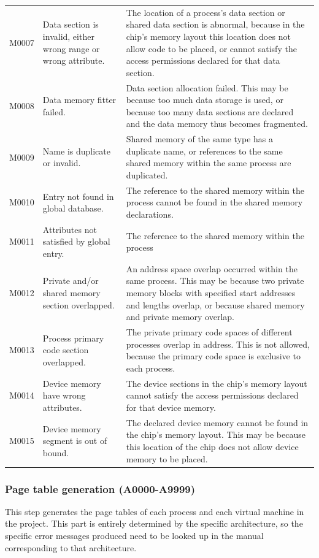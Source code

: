 \begin{xltabular}{\textwidth}{@{}>{\hsize\raggedright\arraybackslash}X>{\hsize\raggedright\arraybackslash}X>{\hsize\raggedright\arraybackslash}X@{}}
M0007 & Data section is invalid, either wrong range or wrong attribute.
&
The location of a process's data section or shared data section is abnormal, because in the chip's memory layout this location does not allow code to be placed, or cannot satisfy the access permissions declared for that data section.\tabularnewline
M0008 & Data memory fitter failed. &
Data section allocation failed. This may be because too much data storage is used, or because too many data sections are declared and the data memory thus becomes fragmented.\tabularnewline
M0009 & Name is duplicate or invalid. &
Shared memory of the same type has a duplicate name, or references to the same shared memory within the same process are duplicated.\tabularnewline
M0010 & Entry not found in global database. &
The reference to the shared memory within the process cannot be found in the shared memory declarations.\tabularnewline
M0011 & Attributes not satisfied by global entry. &
The reference to the shared memory within the process\tabularnewline
M0012 & Private and/or shared memory section overlapped. &
An address space overlap occurred within the same process. This may be because two private memory blocks with specified start addresses and lengths overlap, or because shared memory and private memory overlap.\tabularnewline
M0013 & Process primary code section overlapped. &
The private primary code spaces of different processes overlap in address. This is not allowed, because the primary code space is exclusive to each process.\tabularnewline
M0014 & Device memory have wrong attributes. &
The device sections in the chip's memory layout cannot satisfy the access permissions declared for that device memory.\tabularnewline
M0015 & Device memory segment is out of bound. &
The declared device memory cannot be found in the chip's memory layout. This may be because this location of the chip does not allow device memory to be placed.\tabularnewline
\end{xltabular}

\subsubsection{Page table generation (A0000-A9999)}\label{subsubsec:5-6-4-3}

This step generates the page tables of each process and each virtual machine in the project. This part is entirely determined by the specific architecture, so the specific error messages produced need to be looked up in the manual corresponding to that architecture.


